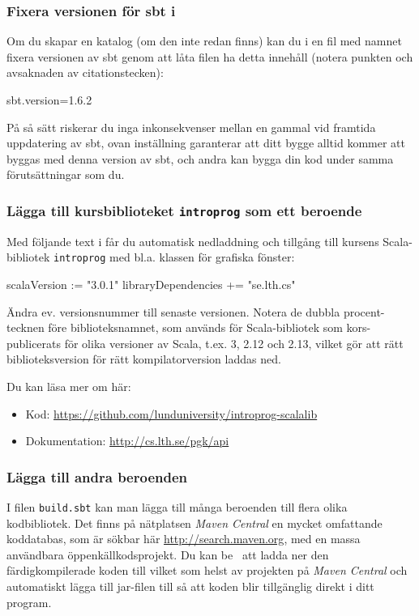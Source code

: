 \subsubsection{Fixera versionen för sbt i }
Om du skapar en katalog  (om den inte redan finns) kan du i en fil med namnet  fixera versionen av sbt genom att låta filen ha detta innehåll (notera punkten och avsaknaden av citationstecken):
\begin{Code}
sbt.version=1.6.2
\end{Code}
På så sätt riskerar du inga inkonsekvenser mellan en gammal  vid framtida uppdatering av sbt, ovan inställning garanterar att ditt bygge alltid kommer att byggas med denna version av sbt, och andra kan bygga din kod under samma förutsättningar som du.

\subsubsection{Lägga till kursbiblioteket \texttt{introprog} som ett beroende}

Med följande text i  får du automatisk nedladdning och tillgång till kursens Scala-bibliotek \texttt{introprog} med bl.a. klassen  för grafiska fönster:

\begin{Code}
scalaVersion := "3.0.1"
libraryDependencies += "se.lth.cs" %
\end{Code}
Ändra ev. versionsnummer till senaste versionen. Notera de dubbla procent-tecknen före biblioteksnamnet, som används för Scala-bibliotek som kors-publicerats för olika versioner av Scala, t.ex. 3, 2.12 och 2.13, vilket gör att rätt biblioteksversion för rätt kompilatorversion laddas ned.

Du kan läsa mer om  här: 
\begin{itemize}
  \item Kod: \url{https://github.com/lunduniversity/introprog-scalalib}
	\item Dokumentation: \url{http://cs.lth.se/pgk/api}
\end{itemize}


\subsubsection{Lägga till andra beroenden}

I filen \texttt{build.sbt} kan man lägga till många beroenden till flera olika kodbibliotek. Det finns på nätplatsen \textit{Maven Central} en mycket omfattande koddatabas, som är sökbar här \url{http://search.maven.org}, med en massa användbara öppenkällkodsprojekt. Du kan be \sbt\ att ladda ner den färdigkompilerade koden till vilket som helst av projekten på \textit{Maven Central} och automatiskt lägga till jar-filen till  så att koden blir tillgänglig direkt i ditt program.


